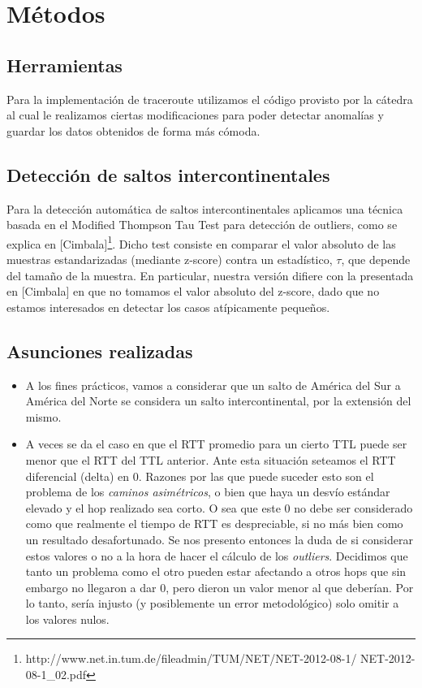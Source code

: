 \section{Métodos}

\subsection*{Herramientas}
Para la implementación de traceroute utilizamos el código provisto por la cátedra al cual le realizamos ciertas modificaciones para poder detectar anomalías y guardar los datos obtenidos de forma más cómoda.

\subsection*{Detección de saltos intercontinentales}

Para la detección automática de saltos intercontinentales aplicamos una técnica basada en el Modified Thompson Tau Test para detección de outliers, como se explica en [Cimbala]\footnote{http://www.net.in.tum.de/fileadmin/TUM/NET/NET-2012-08-1/
NET-2012-08-1\_02.pdf}. Dicho test consiste en comparar el valor absoluto de las muestras estandarizadas (mediante z-score) contra un estadístico, $\tau$, que depende del tamaño de la muestra. En particular, nuestra versión difiere con la presentada en [Cimbala] en que no tomamos el valor absoluto del z-score, dado que no estamos interesados en detectar los casos atípicamente pequeños. 

\subsection*{Asunciones realizadas}
\begin{itemize}
	\item A los fines prácticos, vamos a considerar que un salto de América del Sur a América del Norte se considera un salto intercontinental, por la extensión del mismo.
	\item A veces se da el caso en que el RTT promedio para un cierto TTL puede ser menor que el RTT del TTL anterior. Ante esta situación seteamos el RTT diferencial (delta) en 0. Razones por las que puede suceder esto son el problema de los \emph{caminos asimétricos}, o bien que haya un desvío estándar elevado y el hop realizado sea corto. O sea que este 0 no debe ser considerado como que realmente el tiempo de RTT es despreciable, si no más bien como un resultado desafortunado. Se nos presento entonces la duda de si considerar estos valores o no a la hora de hacer el cálculo de los \emph{outliers}. Decidimos que tanto un problema como el otro pueden estar afectando a otros hops que sin embargo no llegaron a dar 0, pero dieron un valor menor al que deberían. Por lo tanto, sería injusto (y posiblemente un error metodológico) solo omitir a los valores nulos.
\end{itemize}


